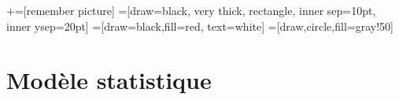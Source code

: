 \usetikzlibrary{positioning}
\usetikzlibrary{snakes}
\usetikzlibrary{calc}
\usetikzlibrary{arrows}
\usetikzlibrary{decorations.markings}
\usetikzlibrary{shapes.misc}
\usetikzlibrary{matrix,shapes,arrows,fit,tikzmark}
\usetikzlibrary{shapes}
\newcommand\marktopleft[1]{%
    \tikz[overlay,remember picture] 
        \node (marker-#1-a) at (-.3em,.3em) {};%
}
\newcommand\markbottomright[2]{%
    \tikz[overlay,remember picture] 
        \node (marker-#1-b) at (0em,0em) {};%
}
+=[remember picture] 
 =[draw=black, very thick, rectangle, inner sep=10pt, inner ysep=20pt]
 =[draw=black,fill=red, text=white]
=[draw,circle,fill=gray!50]



\begin{frame}
\titlepage
\end{frame}
\begin{frame}
 \tableofcontents
    \end{frame}



\section{Modèle statistique}
\frame{\sectionpage}


